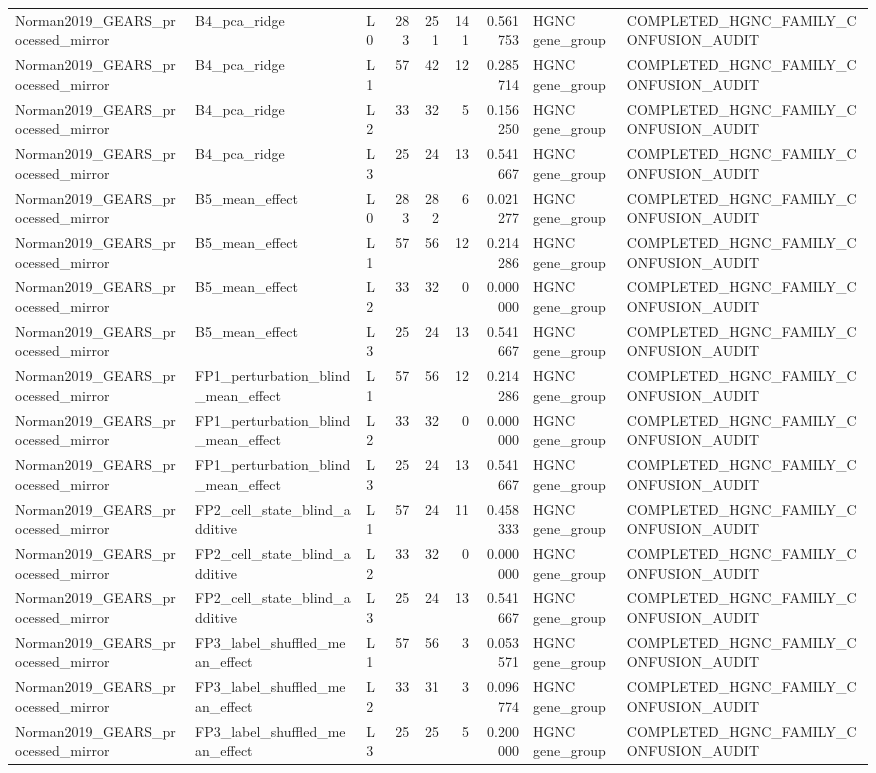 \begin{tabular}{lllrrrrll}
Norman2019_GEARS_processed_mirror & B4_pca_ridge & L0 & 283 & 251 & 141 & 0.561753 & HGNC gene_group & COMPLETED_HGNC_FAMILY_CONFUSION_AUDIT \\
Norman2019_GEARS_processed_mirror & B4_pca_ridge & L1 & 57 & 42 & 12 & 0.285714 & HGNC gene_group & COMPLETED_HGNC_FAMILY_CONFUSION_AUDIT \\
Norman2019_GEARS_processed_mirror & B4_pca_ridge & L2 & 33 & 32 & 5 & 0.156250 & HGNC gene_group & COMPLETED_HGNC_FAMILY_CONFUSION_AUDIT \\
Norman2019_GEARS_processed_mirror & B4_pca_ridge & L3 & 25 & 24 & 13 & 0.541667 & HGNC gene_group & COMPLETED_HGNC_FAMILY_CONFUSION_AUDIT \\
Norman2019_GEARS_processed_mirror & B5_mean_effect & L0 & 283 & 282 & 6 & 0.021277 & HGNC gene_group & COMPLETED_HGNC_FAMILY_CONFUSION_AUDIT \\
Norman2019_GEARS_processed_mirror & B5_mean_effect & L1 & 57 & 56 & 12 & 0.214286 & HGNC gene_group & COMPLETED_HGNC_FAMILY_CONFUSION_AUDIT \\
Norman2019_GEARS_processed_mirror & B5_mean_effect & L2 & 33 & 32 & 0 & 0.000000 & HGNC gene_group & COMPLETED_HGNC_FAMILY_CONFUSION_AUDIT \\
Norman2019_GEARS_processed_mirror & B5_mean_effect & L3 & 25 & 24 & 13 & 0.541667 & HGNC gene_group & COMPLETED_HGNC_FAMILY_CONFUSION_AUDIT \\
Norman2019_GEARS_processed_mirror & FP1_perturbation_blind_mean_effect & L1 & 57 & 56 & 12 & 0.214286 & HGNC gene_group & COMPLETED_HGNC_FAMILY_CONFUSION_AUDIT \\
Norman2019_GEARS_processed_mirror & FP1_perturbation_blind_mean_effect & L2 & 33 & 32 & 0 & 0.000000 & HGNC gene_group & COMPLETED_HGNC_FAMILY_CONFUSION_AUDIT \\
Norman2019_GEARS_processed_mirror & FP1_perturbation_blind_mean_effect & L3 & 25 & 24 & 13 & 0.541667 & HGNC gene_group & COMPLETED_HGNC_FAMILY_CONFUSION_AUDIT \\
Norman2019_GEARS_processed_mirror & FP2_cell_state_blind_additive & L1 & 57 & 24 & 11 & 0.458333 & HGNC gene_group & COMPLETED_HGNC_FAMILY_CONFUSION_AUDIT \\
Norman2019_GEARS_processed_mirror & FP2_cell_state_blind_additive & L2 & 33 & 32 & 0 & 0.000000 & HGNC gene_group & COMPLETED_HGNC_FAMILY_CONFUSION_AUDIT \\
Norman2019_GEARS_processed_mirror & FP2_cell_state_blind_additive & L3 & 25 & 24 & 13 & 0.541667 & HGNC gene_group & COMPLETED_HGNC_FAMILY_CONFUSION_AUDIT \\
Norman2019_GEARS_processed_mirror & FP3_label_shuffled_mean_effect & L1 & 57 & 56 & 3 & 0.053571 & HGNC gene_group & COMPLETED_HGNC_FAMILY_CONFUSION_AUDIT \\
Norman2019_GEARS_processed_mirror & FP3_label_shuffled_mean_effect & L2 & 33 & 31 & 3 & 0.096774 & HGNC gene_group & COMPLETED_HGNC_FAMILY_CONFUSION_AUDIT \\
Norman2019_GEARS_processed_mirror & FP3_label_shuffled_mean_effect & L3 & 25 & 25 & 5 & 0.200000 & HGNC gene_group & COMPLETED_HGNC_FAMILY_CONFUSION_AUDIT \\
\bottomrule
\end{tabular}

